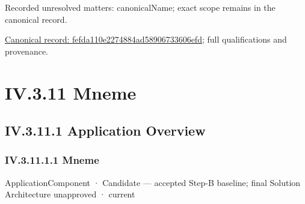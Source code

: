 {\small Recorded unresolved matters: canonicalName; exact scope remains in the canonical record.}\par
{\footnotesize \href{../../../../continuum/application/application-component/fefda110e2274884ad58906733606efd.md}{Canonical record: fefda110e2274884ad58906733606efd}; full qualifications and provenance.}\par
\section*{IV.3.11 Mneme}
\label{navigation:IV.3.11}

\subsection*{IV.3.11.1 Application Overview}
\label{navigation:IV.3.11.1}

\subsubsection*{IV.3.11.1.1 Mneme}
\label{navigation:IV.3.11.1.1}

\label{element:1af8a56358f7429fabfb57be66542a99}
{\small ApplicationComponent · Candidate — accepted Step-B baseline; final Solution Architecture unapproved · current}\par

